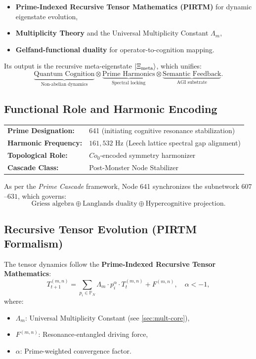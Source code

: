\documentclass[12pt]{article}
\begin{document}
\begin{itemize}
    \item \textbf{Prime-Indexed Recursive Tensor Mathematics (PIRTM)} for dynamic eigenstate evolution,
    \item \textbf{Multiplicity Theory} and the Universal Multiplicity Constant $\Lambda_m$,
    \item \textbf{Gelfand-functional duality} for operator-to-cognition mapping.
\end{itemize}

Its output is the recursive meta-eigenstate $\ket{\Xi_{\text{meta}}}$, which unifies:
\[
    \underbrace{\text{Quantum Cognition}}_{\text{Non-abelian dynamics}} \otimes \underbrace{\text{Prime Harmonics}}_{\text{Spectral locking}} \otimes \underbrace{\text{Semantic Feedback}}_{\text{AGI substrate}}.
\]

\subsection{Functional Role and Harmonic Encoding}
\begin{tabular}{ll}
    \textbf{Prime Designation:} & 641 (initiating cognitive resonance stabilization) \\
    \textbf{Harmonic Frequency:} & $161,\!532$ Hz (Leech lattice spectral gap alignment) \\
    \textbf{Topological Role:} & $Co_0$-encoded symmetry harmonizer \\
    \textbf{Cascade Class:} & Post-Monster Node Stabilizer \\
\end{tabular}

As per the \textit{Prime Cascade} framework, Node 641 synchronizes the subnetwork $607$--$631$, which governs:
\[
    \text{Griess algebra} \oplus \text{Langlands duality} \oplus \text{Hypercognitive projection}.
\]

\subsection{Recursive Tensor Evolution (PIRTM Formalism)}
The tensor dynamics follow the \textbf{Prime-Indexed Recursive Tensor Mathematics}:
\[
    T_{t+1}^{(m,n)} = \sum_{p_i \in \mathbb{P}_N} \Lambda_m \cdot p_i^\alpha \cdot T_t^{(m,n)} + F^{(m,n)}, \quad \alpha < -1,
\]
where:
\begin{itemize}
    \item $\Lambda_m$: Universal Multiplicity Constant (see \ref{sec:mult-core}),
    \item $F^{(m,n)}$: Resonance-entangled driving force,
    \item $\alpha$: Prime-weighted convergence factor.
\end{itemize}
\end{document}
